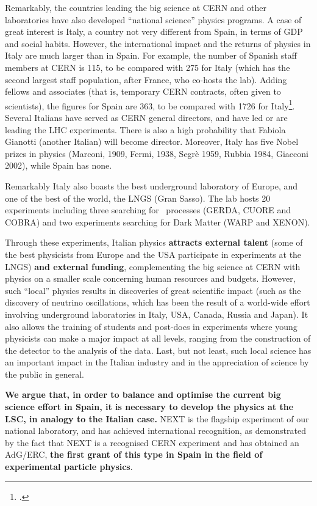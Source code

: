 \documentclass[a4paper,11pt,oneside]{article}
\begin{document}
Remarkably, the countries leading the big science at CERN and other
laboratories have also developed ``national science'' physics
programs. A case of great interest is Italy, a country not very
different from Spain, in terms of GDP and social habits. However, the
international impact and the returns of physics in Italy are much
larger than in Spain. For example, the number of Spanish staff members
at CERN is 115, to be compared with 275 for Italy (which has the
second largest staff population, after France, who co-hosts the
lab). Adding fellows and associates (that is, temporary CERN
contracts, often given to scientists), the figures for Spain are 363,
to be compared with 1726 for Italy\footcite{cernstats}. Several
Italians have served as CERN general directors, and have led or are
leading the LHC experiments. There is also a high probability that
Fabiola Gianotti (another Italian) will become director. Moreover, Italy has five Nobel prizes in physics (Marconi, 1909, Fermi, 1938, Segrè 1959, Rubbia 1984, Giacconi 2002), while Spain has none. 

Remarkably Italy also boasts the best underground laboratory of
Europe, and one of the best of the world, the LNGS (Gran Sasso). The lab hosts 20 experiments including three searching for \bbonu\ processes (GERDA, CUORE and COBRA) and two experiments searching for Dark Matter (WARP and XENON). 

Through these experiments, Italian physics {\bf attracts external talent} (some of the best physicists from Europe and the USA participate in experiments at the LNGS) {\bf and external funding}, complementing the big science at CERN with physics on a smaller scale concerning human resources and budgets. However, such ``local'' physics results in discoveries of great scientific impact (such as the discovery of neutrino oscillations, which has been the result of a world-wide effort involving underground laboratories in Italy, USA, Canada, Russia and Japan). It also allows the training of students and post-docs in experiments where young physicists can make a major impact at all levels, ranging from the construction of the detector to the analysis of the data. Last, but not least, such local science has an important impact in the Italian industry and in the appreciation of science by the public in general. 

{\bf We argue that, in order to balance and optimise the current big science effort in Spain, it is necessary to develop the physics at the LSC, in analogy to the Italian case.} NEXT is the flagship experiment of our national laboratory, and has achieved international recognition, as demonstrated by the fact that NEXT is a recognised CERN experiment and has obtained an AdG/ERC, {\bf the first grant of this type in Spain in the field of experimental particle physics}. 
\end{document}

